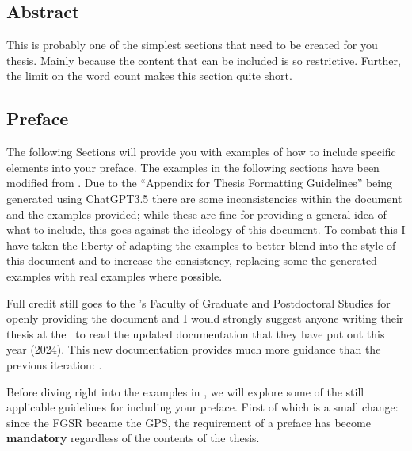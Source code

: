 		\subsection{Abstract}\label{abstract}
			This is probably one of the simplest sections that need to be created for you thesis.
			Mainly because the content that can be included is so restrictive.
			Further, the limit on the word count makes this section quite short.
			

		\subsection{Preface}\label{preface}
			The following Sections will provide you with examples of how to include specific elements into your preface.
			The examples in the following sections have been modified from .
			Due to the ``Appendix for Thesis Formatting Guidelines'' being generated using ChatGPT3.5 there are some inconsistencies within the document and the examples provided; while these are fine for providing a general idea of what to include, this goes against the ideology of this document.
			To combat this I have taken the liberty of adapting the examples to better blend into the style of this document and to increase the consistency, replacing some the generated examples with real examples where possible.
			
			Full credit still goes to the \UofA's Faculty of Graduate and Postdoctoral Studies for openly providing the document and I would strongly suggest anyone writing their thesis at the \UofA\ to read the updated documentation that they have put out this year (2024).
			This new documentation provides much more guidance than the previous iteration: .
			
			
			Before diving right into the examples in , we will explore some of the still applicable guidelines for including your preface. First of which is a small change: since the FGSR became the GPS, the requirement of a preface has become \textbf{mandatory} regardless of the contents of the thesis.
			
